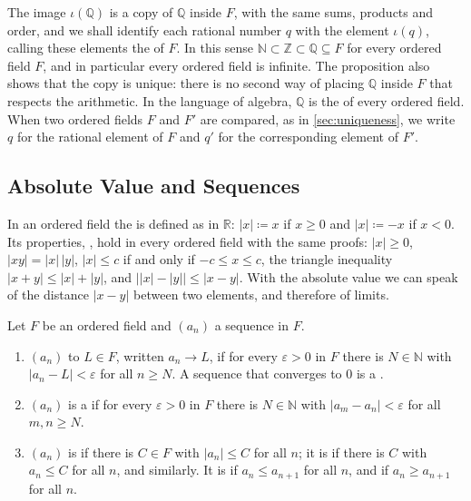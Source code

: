 The image $\iota(\mathbb Q)$ is a copy of $\mathbb Q$ inside $F$, with the same sums, products and order, and we shall identify each rational number $q$ with the element $\iota(q)$, calling these elements the  of $F$. In this sense $\mathbb N\subset\mathbb Z\subset\mathbb Q\subseteq F$ for every ordered field $F$, and in particular every ordered field is infinite. The proposition also shows that the copy is unique: there is no second way of placing $\mathbb Q$ inside $F$ that respects the arithmetic. In the language of algebra, $\mathbb Q$ is the  of every ordered field. When two ordered fields $F$ and $F'$ are compared, as in \cref{sec:uniqueness}, we write $q$ for the rational element of $F$ and $q'$ for the corresponding element of $F'$.

\subsection{Absolute Value and Sequences}

In an ordered field the  is defined as in $\mathbb R$: $|x|\coloneqq x$ if $x\ge0$ and $|x|\coloneqq-x$ if $x<0$. Its properties, , hold in every ordered field with the same proofs: $|x|\ge0$, $|xy|=|x|\,|y|$, $|x|\le c$ if and only if $-c\le x\le c$, the triangle inequality $|x+y|\le|x|+|y|$, and $\bigl||x|-|y|\bigr|\le|x-y|$. With the absolute value we can speak of the distance $|x-y|$ between two elements, and therefore of limits.

\begin{definition}
\label{def:of-convergence}
Let $F$ be an ordered field and $(a_n)$ a sequence in $F$.
\begin{enumerate}
\item $(a_n)$  to $L\in F$, written $a_n\to L$, if for every $\varepsilon>0$ in $F$ there is $N\in\mathbb N$ with $|a_n-L|<\varepsilon$ for all $n\ge N$. A sequence that converges to $0$ is a .
\item $(a_n)$ is a  if for every $\varepsilon>0$ in $F$ there is $N\in\mathbb N$ with $|a_m-a_n|<\varepsilon$ for all $m,n\ge N$.
\item $(a_n)$ is  if there is $C\in F$ with $|a_n|\le C$ for all $n$; it is  if there is $C$ with $a_n\le C$ for all $n$, and  similarly. It is  if $a_n\le a_{n+1}$ for all $n$, and  if $a_n\ge a_{n+1}$ for all $n$.
\end{enumerate}
\end{definition}

